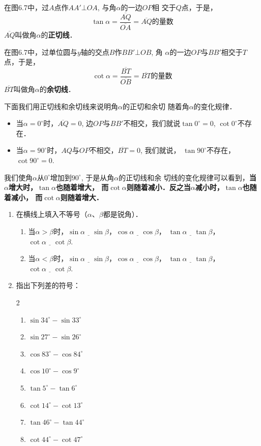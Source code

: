 在图6.7中，过$A$点作$AA'\bot OA$, 与角$\alpha$的一边$OP$相
交于$Q$点，于是，
\[\tan\alpha=\frac{\overline{AQ}}{\overline{OA}}=\overline{AQ}\text{的量数}\]
$\overline{AQ}$叫做角$\alpha$的\textbf{正切线}．

在图6.7中，过单位圆与$y$轴的交点$B$作$BB'\bot OB$, 角
$\alpha$的一边$OP$与$BB'$相交于$T$点，于是，
\[\cot\alpha=\frac{\overline{BT}}{\overline{OB}}=\overline{BT}\text{的量数}\]
$\overline{BT}$叫做角$\alpha$的\textbf{余切线}．

下面我们用正切线和余切线来说明角$\alpha$的正切和余切
随着角$\alpha$的变化规律．

\begin{itemize}
    \item 当$\alpha =0^{\circ}$时，$\overline{AQ}=0$, 边$OP$与$BB'$不相交，我们就说$\tan0^{\circ}=0$,
    $\cot 0^{\circ}$不存在．
    \item 当$\alpha =90^{\circ}$时，$AQ$与$OP$不相交，$\overline{BT}=0$, 
    我们就说，
    $\tan90^{\circ}$不存在，
    $\cot 90^{\circ}=0$.
\end{itemize}

我们使角$\alpha$从$0^{\circ}$增加到$90^{\circ}$, 于是从角$\alpha$的正切线和余
切线的变化规律可以看到，\textbf{当$\alpha$增大时，$\tan\alpha$也随着增大，
而$\cot\alpha$则随着减小．反之当$\alpha$减小时，$\tan\alpha$也随着减小，
而$\cot\alpha$则随着增大．}


\begin{ex}
\begin{enumerate}
    \item 在横线上填入不等号（$\alpha$、$\beta$都是锐角）．
    \begin{enumerate}
    \item 当$\alpha>\beta$时，$\sin\alpha\underline{\quad}\sin\beta$，$\cos\alpha\underline{\quad}\cos\beta$，
    $\tan\alpha\underline{\quad}\tan\beta$，$\cot\alpha\underline{\quad}\cot\beta$.
    \item 当$\alpha<\beta$时，$\sin\alpha\underline{\quad}\sin\beta$，$\cos\alpha\underline{\quad}\cos\beta$，
    $\tan\alpha\underline{\quad}\tan\beta$，$\cot\alpha\underline{\quad}\cot\beta$.
    \end{enumerate}

    \item 指出下列差的符号：
\begin{multicols}{2}
\begin{enumerate}
    \item $\sin34^{\circ}-\sin33^{\circ}$
    \item $ \sin27^{\circ}-\sin26^{\circ}$
    \item $\cos83^{\circ}-\cos84^{\circ}$
    \item $\cos10^{\circ}-\cos9^{\circ}$
    \item $\tan 5^{\circ}-\tan 6^{\circ}$
    \item $\cot 14^{\circ}-\cot 13^{\circ}$
    \item $\tan 46^{\circ}-\tan 44^{\circ}$
    \item $\cot 44^{\circ}-\cot 47^{\circ}$
\end{enumerate}
\end{multicols}
\end{enumerate}
\end{ex}

